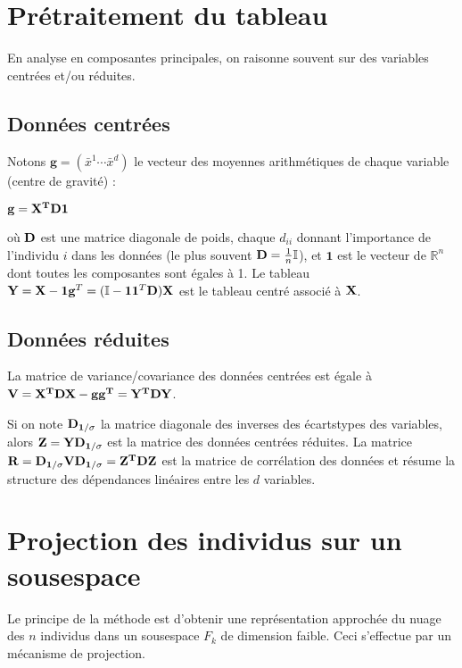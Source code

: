 \documentclass[letterpaper,10pt,english]{jupyterBook}
\begin{document}
\section{Pré\sphinxhyphen{}traitement du tableau}
\label{\detokenize{acp:pre-traitement-du-tableau}}
\sphinxAtStartPar
En analyse en composantes principales, on raisonne souvent sur des variables centrées et/ou réduites.


\subsection{Données centrées}
\label{\detokenize{acp:donnees-centrees}}
\sphinxAtStartPar
Notons \(\mathbf{g} = \left ( \bar{x}^1\cdots \bar{x}^d\right )\) le vecteur des moyennes arithmétiques de chaque variable (centre de gravité) :

\sphinxAtStartPar
\(\mathbf{g}={\bf X^TD\mathbf{1}}\)

\sphinxAtStartPar
où \({\bf D}\) est une matrice diagonale de poids,  chaque \(d_{ii}\) donnant l’importance de l’individu \(i\) dans les données (le plus souvent \({\bf D}=\frac{1}{n}{ \mathbb{I}}\)),  et \(\mathbf{1}\) est le vecteur de \(\mathbb{R}^n\) dont toutes les composantes sont égales à 1. Le tableau \({\bf Y}={\bf X}-\mathbf{1}\mathbf{g}^T=({ \mathbb{I}}-\mathbf{1}\mathbf{1}^T{\bf D}){\bf X}\) est le tableau centré associé à \({\bf X}\).


\subsection{Données réduites}
\label{\detokenize{acp:donnees-reduites}}
\sphinxAtStartPar
La matrice de variance/covariance des données centrées est égale à
\({\bf V} = {\bf X^TDX} - \mathbf{g}\mathbf{g^T} = {\bf Y^TDY}\).

\sphinxAtStartPar
Si on note \({\bf D_{1/\sigma}}\) la matrice diagonale des inverses des écarts\sphinxhyphen{}types des variables, alors  \({\bf Z}={\bf YD_{1/\sigma}}\)
est la matrice des données centrées réduites. La matrice \({\bf R}={\bf D_{1/\sigma}VD_{1/\sigma}}={\bf Z^TDZ}\)
est la matrice de corrélation des données et résume la structure des dépendances linéaires entre les \(d\) variables.


\section{Projection des individus sur un sous\sphinxhyphen{}espace}
\label{\detokenize{acp:projection-des-individus-sur-un-sous-espace}}
\sphinxAtStartPar
Le principe de la méthode est d’obtenir une représentation approchée du nuage des \(n\) individus dans un sous\sphinxhyphen{}espace \(F_k\) de dimension faible. Ceci s’effectue par un mécanisme de projection.
\end{document}
